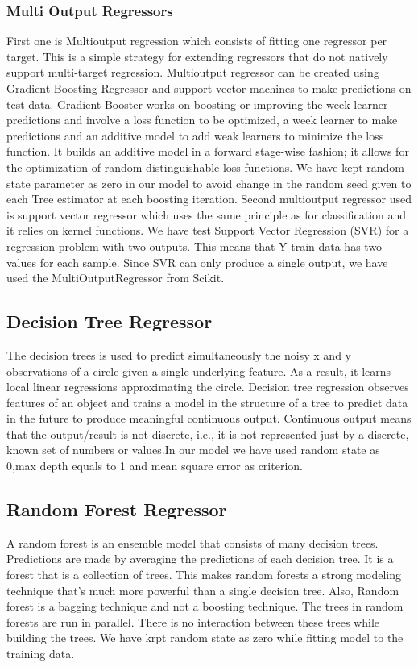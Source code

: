 \subsubsection{Multi Output Regressors}
First one is Multioutput regression which consists of fitting one regressor per target. This is a simple strategy for extending regressors that do not natively support multi-target regression. Multioutput regressor can be created using Gradient Boosting Regressor and support vector machines to make predictions on test data.\newline %
Gradient Booster works on boosting or improving the week learner predictions and involve a loss function to be optimized, a week learner to make predictions and an additive model to add weak learners to minimize the loss function. It builds an additive model in a forward stage-wise fashion; it allows for the optimization of random distinguishable loss functions. We have kept random state parameter as zero in our model to avoid change in  the random seed given to each Tree estimator at each boosting iteration.\newline%
Second multioutput regressor used is support vector regressor which uses the same principle as for classification and it relies on kernel functions. We have test Support Vector Regression (SVR) for a regression problem with two outputs. This means that Y train data has two values for each sample. Since SVR can only produce a single output, we have used the MultiOutputRegressor from Scikit.
\subsection{Decision Tree Regressor}
The decision trees is used to predict simultaneously the noisy x and y observations of a circle given a single underlying feature. As a result, it learns local linear regressions approximating the circle. Decision tree regression observes features of an object and trains a model in the structure of a tree to predict data in the future to produce meaningful continuous output. Continuous output means that the output/result is not discrete, i.e., it is not represented just by a discrete, known set of numbers or values.In our model we have used random state as 0,max depth equals to 1 and mean square error as criterion.\newline
\subsection{Random Forest Regressor}
A random forest is an ensemble model that consists of many decision trees. Predictions are made by averaging the predictions of each decision tree. It is a forest that is a collection of trees. This makes random forests a strong modeling technique that’s much more powerful than a single decision tree. Also, Random forest is a bagging technique and not a boosting technique. The trees in random forests are run in parallel. There is no interaction between these trees while building the trees. We have krpt random state as zero while fitting model to the training data.\newline

